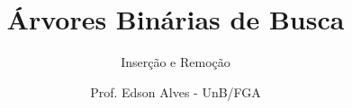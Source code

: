 \title{Árvores Binárias de Busca}
\subtitle{Inserção e Remoção}
\author{Prof. Edson Alves - UnB/FGA}
\date{}
